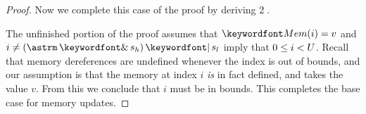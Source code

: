 \documentclass[11pt,twoside]{scrartcl}
\begin{document}
\begin{proof}
Now we complete this case of the proof by deriving \textcircled{2}.
\begin{sequentdeduction}
 {
}
\end{sequentdeduction}
The unfinished portion of the proof assumes that $\pderef{i}=v$ and $i \ne (\astrm \bitand s_h) \bitor s_l$ imply that $0 \le i < U$. Recall that memory dereferences are undefined whenever the index is out of bounds, and our assumption is that the memory at index $i$ \emph{is} in fact defined, and takes the value $v$. From this we conclude that $i$ must be in bounds. This completes the base case for memory updates.


\end{proof}
\end{document}
